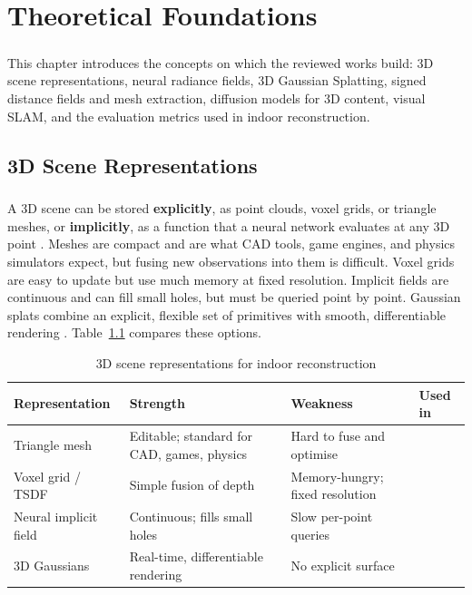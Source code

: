 \documentclass[12pt,a4paper,final]{extreport}
\begin{document}
\chapter{Theoretical Foundations}

\paragraph{} This chapter introduces the concepts on which the reviewed works build: 3D scene representations, neural radiance fields, 3D Gaussian Splatting, signed distance fields and mesh extraction, diffusion models for 3D content, visual SLAM, and the evaluation metrics used in indoor reconstruction.

\section{3D Scene Representations}

\paragraph{} A 3D scene can be stored \textbf{explicitly}, as point clouds, voxel grids, or triangle meshes, or \textbf{implicitly}, as a function that a neural network evaluates at any 3D point \cite{p4}. Meshes are compact and are what CAD tools, game engines, and physics simulators expect, but fusing new observations into them is difficult. Voxel grids are easy to update but use much memory at fixed resolution. Implicit fields are continuous and can fill small holes, but must be queried point by point. Gaussian splats combine an explicit, flexible set of primitives with smooth, differentiable rendering \cite{p3}. Table~\ref{tab:repr} compares these options.

{\renewcommand{\arraystretch}{1.15}
\begin{table}[htbp]
\centering
\caption{3D scene representations for indoor reconstruction}\label{tab:repr}
\small
\begin{tabularx}{\textwidth}{|>{\raggedright\arraybackslash}p{3.0cm}|X|X|p{1.4cm}|}
\hline
\textbf{Representation} & \textbf{Strength} & \textbf{Weakness} & \textbf{Used in} \\ \hline
Triangle mesh & Editable; standard for CAD, games, physics & Hard to fuse and optimise & \cite{p1,p2,p4} \\ \hline
Voxel grid / TSDF & Simple fusion of depth & Memory-hungry; fixed resolution & \cite{p2} \\ \hline
Neural implicit field & Continuous; fills small holes & Slow per-point queries & \cite{p4} \\ \hline
3D Gaussians & Real-time, differentiable rendering & No explicit surface & \cite{p3} \\ \hline
\end{tabularx}
\end{table}}
\end{document}
